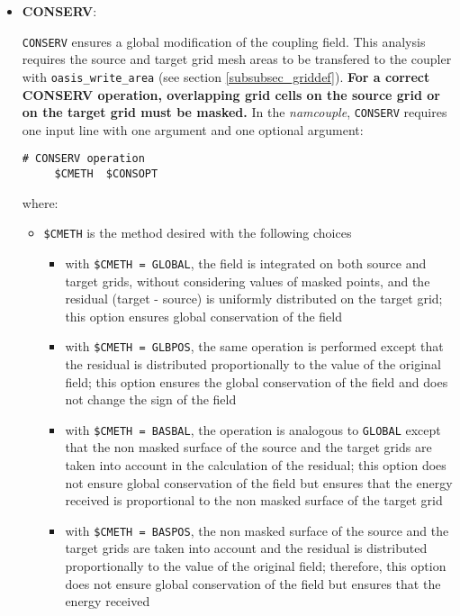 \begin{itemize}

\item {\bf CONSERV}:

  {\tt CONSERV} ensures a global modification of the coupling field.
  This analysis requires the source and target grid mesh areas to be
  transfered to the coupler with {\tt oasis\_write\_area} (see section
  \ref{subsubsec_griddef}). {\bf For a correct CONSERV operation,
    overlapping grid cells on the source grid or on the target grid
    must be masked.} In the {\it namcouple}, {\tt CONSERV} requires
  one input line with one argument and one optional argument:

 \begin{verbatim}
# CONSERV operation
     $CMETH  $CONSOPT
\end{verbatim}
  \vspace{-0.5cm} where:
  \begin{itemize}
  \item {\tt \$CMETH} is the method desired with the following choices
    \begin{itemize}
    \item with {\tt \$CMETH = GLOBAL}, the field is integrated on both
      source and target grids, without considering values of masked
      points, and the residual (target - source) is uniformly
      distributed on the target grid; this option ensures global
      conservation of the field
    \item with {\tt \$CMETH = GLBPOS}, the same operation is performed
      except that the residual is distributed proportionally to the
      value of the original field; this option ensures the global
      conservation of the field and does not change the sign of the
      field
    \item with {\tt \$CMETH = BASBAL}, the operation is analogous to
      {\tt GLOBAL} except that the non masked surface of the source
      and the target grids are taken into account in the calculation
      of the residual; this option does not ensure global conservation
      of the field but ensures that the energy received is
      proportional to the non masked surface of the target grid
    \item with {\tt \$CMETH = BASPOS}, the non masked surface of the
      source and the target grids are taken into account and the
      residual is distributed proportionally to the value of the
      original field; therefore, this option does not ensure global
      conservation of the field but ensures that the energy received

\end{itemize}
\end{itemize}
\end{itemize}
